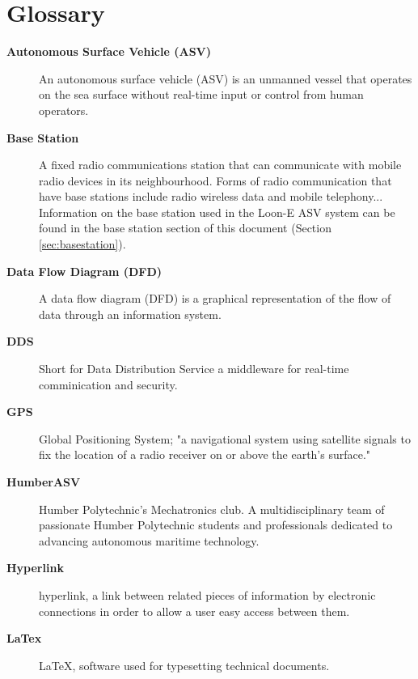 \section{Glossary}
\begin{description}

	\item[\textbf{Autonomous Surface Vehicle (ASV)}]	
	\label{itm:asv}
	An autonomous surface vehicle (ASV) is an unmanned vessel that operates on the sea surface without real-time input or control from human operators.\autocite{TREMBANIS2021251}
	
	\item[\textbf{Base Station}]	
	\label{itm:basestation}
	A fixed radio communications station that can communicate with mobile radio devices in its neighbourhood. Forms of radio communication that have base stations include radio wireless data and mobile telephony...\autocite{BASESTATION2018}
	Information on the base station used in the Loon-E ASV system can be found in the base station section of this document (Section \ref{sec:basestation}).
	
	\item[\textbf{Data Flow Diagram (DFD)}]
	\label{itm:dfd}
	A data flow diagram (DFD) is a graphical representation of the flow of data through an information system.

	\item[\textbf{DDS}]
	Short for Data Distribution Service a middleware for real-time comminication and security.\autocite{MATLABDDS}

	\item[\textbf{GPS}]
	Global Positioning System; "a navigational system using satellite signals to fix the location of a radio receiver on or above the earth's surface."\autocite{GPSDICTIONARY} 

	\item[\textbf{HumberASV}]	
	Humber Polytechnic's Mechatronics club. A multidisciplinary team of passionate Humber Polytechnic students and professionals dedicated to advancing autonomous maritime technology.\autocite{HUMBERASVTEAM}

	\item[\textbf{Hyperlink}]
	hyperlink, a link between related pieces of information by electronic connections in order to allow a user easy access between them.\autocite{HYPERLINKDICTIONARY}

	\item[\textbf{LaTex}]
	LaTeX, software used for typesetting technical documents.\autocite{LATEXDICTIONARY}
	

\end{description}
